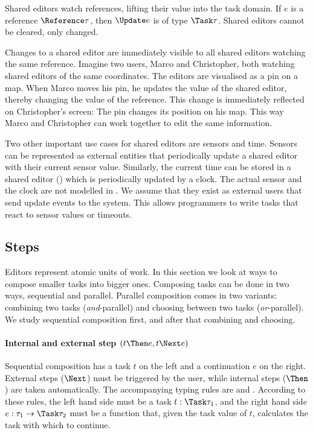 Shared editors watch references, lifting their value into the task domain.
If $e$ is a reference $\Reference \tau$, then $\Update e$ is of type $\Task \tau$.
Shared editors cannot be cleared, only changed.

Changes to a shared editor are immediately visible to all shared editors watching the same reference.
Imagine two users, Marco and Christopher, both watching shared editors of the same coordinates.
The editors are visualised as a pin on a map.
When Marco moves his pin, he updates the value of the shared editor, thereby changing the value of the reference.
This change is immediately reflected on Christopher's screen: The pin changes its position on his map.
This way Marco and Christopher can work together to edit the same information.

\label{sub:time}
Two other important use cases for shared editors are sensors and time.
Sensors can be represented as external entities that periodically update a shared editor with their current sensor value.
Similarly, the current time can be stored in a shared editor () which is periodically updated by a clock.
The actual sensor and the clock are not modelled in \TOPHAT.
We assume that they exist as external users that send update events to the system.
This allows programmers to write tasks that react to sensor values or timeouts.


\subsection{Steps}

Editors represent atomic units of work.
In this section we look at ways to compose smaller tasks into bigger ones.
Composing tasks can be done in two ways, sequential and parallel.
Parallel composition comes in two variants: combining two tasks (\emph{and}-parallel) and choosing between two tasks (\emph{or}-parallel).
We study sequential composition first, and after that combining and choosing.


\paragraph{Internal and external step $(t \Then e, t \Next e)$}
\label{sub:steps}

Sequential composition has a task $t$ on the left and a continuation $e$ on the right.
External steps ($\Next$) must be triggered by the user, while internal steps ($\Then$) are taken automatically.
The accompanying typing rules are  and .
According to these rules, the left hand side must be a task $t : \Task \tau_1$, and the right hand side $e : \tau_1 \to \Task \tau_2$ must be a function that, given the task value of $t$, calculates the task with which to continue.


